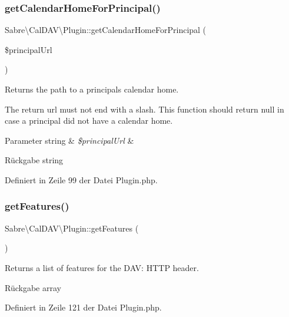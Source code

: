 \subsubsection{\texorpdfstring{get\+Calendar\+Home\+For\+Principal()}{getCalendarHomeForPrincipal()}}
{\footnotesize\ttfamily Sabre\textbackslash{}\+Cal\+D\+A\+V\textbackslash{}\+Plugin\+::get\+Calendar\+Home\+For\+Principal (\begin{DoxyParamCaption}\item[{}]{\$principal\+Url }\end{DoxyParamCaption})}

Returns the path to a principal\textquotesingle{}s calendar home.

The return url must not end with a slash. This function should return null in case a principal did not have a calendar home.


\begin{DoxyParams}[1]{Parameter}
string & {\em \$principal\+Url} & \\
\hline
\end{DoxyParams}
\begin{DoxyReturn}{Rückgabe}
string 
\end{DoxyReturn}


Definiert in Zeile 99 der Datei Plugin.\+php.

\mbox{\label{class_sabre_1_1_cal_d_a_v_1_1_plugin_ac94b65b9bc62b3c4de01dbb7623173cd}} 
\subsubsection{\texorpdfstring{get\+Features()}{getFeatures()}}
{\footnotesize\ttfamily Sabre\textbackslash{}\+Cal\+D\+A\+V\textbackslash{}\+Plugin\+::get\+Features (\begin{DoxyParamCaption}{ }\end{DoxyParamCaption})}

Returns a list of features for the D\+AV\+: H\+T\+TP header.

\begin{DoxyReturn}{Rückgabe}
array 
\end{DoxyReturn}


Definiert in Zeile 121 der Datei Plugin.\+php.

